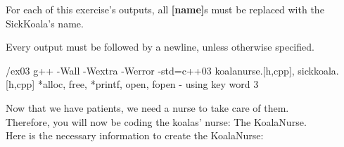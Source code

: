 \warn
{
  For each of this exercise's outputs, all \textbf{[name]}s must be replaced with
  the SickKoala's name.\newline

  Every output must be followed by a newline, unless otherwise specified.
}

\newpage

\printCPPExerciseFormalities
{/ex03}
{g++ -Wall -Wextra -Werror -std=c++03}
{koalanurse.[h,cpp], sickkoala.[h,cpp]}
{*alloc, free, *printf, open, fopen - using key word}
{3}

Now that we have patients, we need a nurse to take care of them.\\
Therefore, you will now be coding the koalas' nurse: The KoalaNurse.\\
Here is the necessary information to create the KoalaNurse:\\
